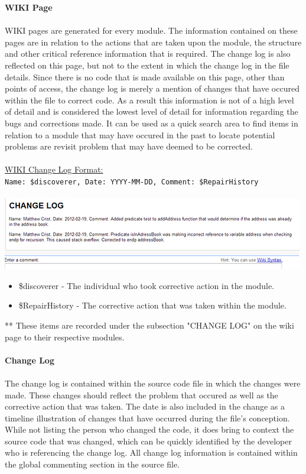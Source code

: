 \documentclass[11pt, letterpaper]{report}
\begin{document}
\begin{description}
\textbf{WIKI Page} \hfill \\ \hfill \\
WIKI pages are generated for every module.  The information contained on these pages are in relation to the actions that are taken upon the module, the structure and other critical reference information that is required.  The change log is also reflected on this page, but not to the extent in which the change log in the file details.  Since there is no code that is made available on this page, other than points of access, the change log is merely a mention of changes that have occured within the file to correct code.  As a result this information is not of a high level of detail and is considered the lowest level of detail for information regarding the bugs and corrections made.  It can be used as a quick search area to find items in relation to a module that may have occured in the past to locate potential problems are revisit problem that may have deemed to be corrected. \hfill \\ \hfill \\
\underline{WIKI Change Log Format:} \hfill \\
\texttt{Name: \$discoverer, Date: YYYY-MM-DD, Comment: \$RepairHistory} \hfill \\ \hfill \\
\includegraphics{change_log---wiki}
\begin{itemize}
	\item \$discoverer - The individual who took corrective action in the module.
	\item \$RepairHistory - The corrective action that was taken within the module.
\end{itemize}
** These items are recorded under the subsection "CHANGE LOG" on the wiki page to their respective modules. \hfill \\ \hfill \\
\textbf{Change Log} \hfill \\ \hfill \\
The change log is contained within the source code file in which the changes were made.  These changes should reflect the problem that occured as well as the corrective action that was taken.  The date is also included in the change as a timeline illustration of changes that have occurred during the file's conception.  While not listing the person who changed the code, it does bring to context the source code that was changed, which can be quickly identified by the developer who is referencing the change log.  All change log information is contained within the global commenting section in the source file. \hfill \\ \hfill \\

\end{description}
\end{document}
